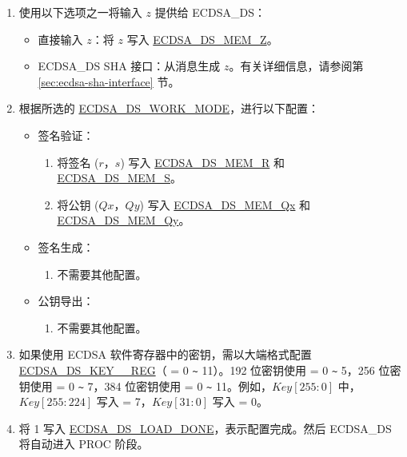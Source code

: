 \documentclass[main\_\_CN.tex]{subfiles}
\begin{document}
\begin{enumerate}
	\item 使用以下选项之一将输入 $z$ 提供给 ECDSA\_DS：
	      \begin{itemize}
		      \item 直接输入 $z$：将 $z$ 写入 \hyperref[tab:ecdsa-memory]{ECDSA\_DS\_MEM\_Z}。
		      \item ECDSA\_DS SHA 接口：从消息生成 $z$。有关详细信息，请参阅第 \ref{sec:ecdsa-sha-interface} 节。
	      \end{itemize}
	\item 根据所选的 \hyperref[fielddesc:ECDSADSWORKMODE]{ECDSA\_DS\_WORK\_MODE}，进行以下配置：
	      \begin{itemize}
		      \item 签名验证：
		            \begin{enumerate}
			            \item 将签名 ($r$，$s$) 写入 \hyperref[tab:ecdsa-memory]{ECDSA\_DS\_MEM\_R} 和 \hyperref[tab:ecdsa-memory]{ECDSA\_DS\_MEM\_S}。
			            \item 将公钥 ($Qx$，$Qy$) 写入 \hyperref[tab:ecdsa-memory]{ECDSA\_DS\_MEM\_Qx} 和 \hyperref[tab:ecdsa-memory]{ECDSA\_DS\_MEM\_Qy}。
		            \end{enumerate}
		      \item 签名生成：
		            \begin{enumerate}
			            \item 不需要其他配置。
		            \end{enumerate}
                \item 公钥导出：
		            \begin{enumerate}
                            \item 不需要其他配置。
		            \end{enumerate}
	      \end{itemize}
        \item 如果使用 ECDSA 软件寄存器中的密钥，需以大端格式配置 \hyperref[regdesc:ECDSADSKEY0REG]{ECDSA\_DS\_KEY\_\_REG}（ = 0 \verb+~+ 11）。192 位密钥使用  = 0 \verb+~+ 5，256 位密钥使用  = 0 \verb+~+ 7，384 位密钥使用  = 0 \verb+~+ 11。例如，$Key[255:0]$ 中，$Key[255:224]$ 写入  = 7，$Key[31:0]$ 写入  = 0。
        \label{sec:ecdsa-software-key-load-stage}
	\item 将 1 写入 \hyperref[fielddesc:ECDSADSLOADDONE]{ECDSA\_DS\_LOAD\_DONE}，表示配置完成。然后 ECDSA\_DS 将自动进入 PROC 阶段。
\end{enumerate}
\end{document}
